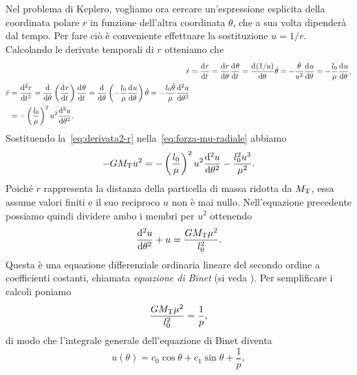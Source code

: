 Nel problema di Keplero, vogliamo ora cercare un'espressione esplicita della
coordinata polare $r$ in funzione dell'altra coordinata $\theta$, che a sua
volta dipenderà dal tempo. Per fare ciò è conveniente effettuare la sostituzione
$u=1/r$. Calcolando le derivate temporali di $r$ otteniamo che
\begin{subequations}
  \begin{align}
    \dot{r} &= \toder{r}{t} = \toder{r}{\theta}\toder{\theta}{t} =
    \toder{(1/u)}{\theta}\dot{\theta} =
    -\frac{\dot{\theta}}{u^2}\toder{u}{\theta}
    = -\frac{l_0}{\mu}\toder{u}{\theta}, \label{eq:derivata1-r}\\
    \begin{split}
      \ddot{r} &= \toder[2]{r}{t} = \toder{}{\theta}
      \left( \toder{r}{t} \right)\toder{\theta}{t} = \toder{}{\theta}
      \left( -\frac{l_0}{\mu}\toder{u}{\theta} \right)\dot{\theta} =
      -\frac{l_0\dot{\theta}}{\mu}\toder[2]{u}{\theta} \\
      &= - \left( \frac{l_0}{\mu}
      \right)^2u^2\toder[2]{u}{\theta}. \label{eq:derivata2-r}
    \end{split}
  \end{align}
\end{subequations}
Sostituendo la~\eqref{eq:derivata2-r} nella~\eqref{eq:forza-mu-radiale} abbiamo
\begin{equation}
  -GM_\textup{T}u^2 = -
  \left(
    \frac{l_0}{\mu}
  \right)^2u^2\toder[2]{u}{\theta} - \frac{l_0^2u^3}{\mu^2}.
\end{equation}
Poiché $r$ rappresenta la distanza della particella di massa ridotta da
$M_\textup{T}$, essa assume valori finiti e il suo reciproco $u$ non è mai
nullo. Nell'equazione precedente possiamo quindi dividere ambo i membri per
$u^2$ ottenendo
\begin{equation}
  \toder[2]{u}{\theta} + u = \frac{GM_\textup{T}\mu^2}{l_0^2}.
\end{equation}
Questa è una equazione differenziale ordinaria lineare del secondo ordine a
coefficienti costanti, chiamata \emph{equazione di Binet}
(si veda \textcite{fabrizio:meccanica}). Per semplificare i calcoli poniamo
\begin{equation}
  \label{eq:reciproco-semilato}
  \frac{GM_\textup{T}\mu^2}{l_0^2} = \frac{1}{p},
\end{equation}
di modo che l'integrale generale dell'equazione di Binet diventa
\begin{equation}
  \label{eq:soluzione-binet}
  u(\theta) = c_0\cos\theta + c_1\sin\theta + \frac{1}{p},
\end{equation}

